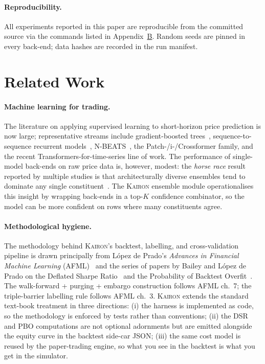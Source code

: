 \documentclass[11pt,a4paper]{article}
\let\oldsection\section
\renewcommand{\section}{\clearpage\oldsection}
\providecommand{\kairon}{\textsc{Kairon}}
\providecommand{\dsr}{\textsc{DSR}}
\providecommand{\pbo}{\textsc{PBO}}
\begin{document}
\paragraph{Reproducibility.}
All experiments reported in this paper are reproducible from the
committed source via the commands listed in
Appendix~\hyperref[app:repro]{B}. Random seeds are pinned in every
back-end; data hashes are recorded in the run manifest.

\section{Related Work}\label{sec:rel}

\paragraph{Machine learning for trading.}
The literature on applying supervised learning to short-horizon
price prediction is now large; representative streams include
gradient-boosted trees~\cite{ke2017lightgbm,chen2016xgboost},
sequence-to-sequence recurrent models~\cite{fischer2018deep},
N-BEATS~\cite{oreshkin2020nbeats}, the
Patch-/i-/Crossformer family, and the recent
Transformers-for-time-series line of work. The performance of
single-model back-ends on raw price data is, however, modest: the
\emph{horse race} result reported by multiple studies is that
architecturally diverse ensembles tend to dominate any single
constituent~\cite{krauss2017deep}. The \kairon{} ensemble module
operationalises this insight by wrapping back-ends in a top-$K$
confidence combinator, so the model can be more confident on rows
where many constituents agree.

\paragraph{Methodological hygiene.}
The methodology behind \kairon{}'s backtest, labelling, and
cross-validation pipeline is drawn principally from
López de Prado's \emph{Advances in Financial Machine Learning}
(AFML)~\cite{lopezdeprado2018afml} and the series of papers by
Bailey and López de Prado on the
Deflated Sharpe Ratio~\cite{bailey2014deflated} and the
Probability of Backtest Overfit~\cite{bailey2015pbo}. The
walk-forward + purging + embargo construction follows
AFML ch.~7; the triple-barrier labelling rule follows
AFML ch.~3. \kairon{} extends the standard text-book treatment
in three directions: (i) the harness is implemented as code, so
the methodology is enforced by tests rather than conventions;
(ii) the \dsr{} and \pbo{} computations are not optional
adornments but are emitted alongside the equity curve in the
backtest side-car JSON; (iii) the same cost model is reused by
the paper-trading engine, so what you see in the backtest is
what you get in the simulator.
\end{document}
